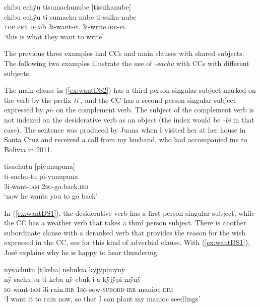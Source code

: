 \ea\label{ex:want-write}
\begingl
\glpreamble chibu echÿu tisumachunube \textup{[}tisuikanube\textup{]}\\
\gla chibu echÿu ti-sumachu-nube ti-suika-nube\\
\textsc{top.prn} \textsc{dem}b 3i-want-\textsc{pl} 3i-write.\textsc{irr}-\textsc{pl} \\
\glft ‘this is what they want to write’
\endgl
\trailingcitation{[mqx-p110826l.688]}
\xe

The previous three examples had CCs and main clauses with shared subjects. The following two examples illustrate the use of \textit{-sachu} with CCs with different subjects.

The main clause in (\ref{ex:wantDS2}) has a third person singular subject marked on the verb by the prefix \textit{ti-}, and the CC has a second person singular subject expressed by \textit{pi-} on the complement verb. The subject of the complement verb is not indexed on the desiderative verb as an object (the index would be \textit{-bi} in that case). The sentence was produced by Juana when I visited her at her house in Santa Cruz and received a call from my husband, who had accompanied me to Bolivia in 2011.

\ea\label{ex:wantDS2}
\begingl
\glpreamble tisachutu \textup{[}piyunupuna\textup{]}\\
\gla ti-sachu-tu pi-yunupuna\\
\glb 3i-want-\textsc{iam} 2\textsc{sg}-go.back.\textsc{irr}\\
\glft ‘now he wants you to go back’
\endgl
\trailingcitation{[jxx-e110923l-2.032]}
\xe


In (\ref{ex:wantDS1}), the desiderative verb has a first person singular subject, while the CC has a weather verb that takes a third person subject. There is another subordinate clause with a deranked verb that provides the reason for the wish expressed in the CC, see  for this kind of adverbial clause. With (\ref{ex:wantDS1}), José explains why he is happy to hear thundering.

\ea\label{ex:wantDS1}
\begingl
\glpreamble nÿsachutu \textup{[}tikeba\textup{]} nebukia kÿjÿpimÿnÿ\\
\gla nÿ-sachu-tu ti-keba nÿ-ebuk-i-a kÿjÿpi-mÿnÿ\\
\textsc{sg}-want-\textsc{iam} 3i-rain.\textsc{irr} 1\textsc{sg}-sow-\textsc{subord}-\textsc{irr} manioc-\textsc{dim}\\
\glft ‘I want it to rain now, so that I can plant my manioc seedlings’
\endgl
\trailingcitation{[mox-c110926s-1.208]}
\xe


